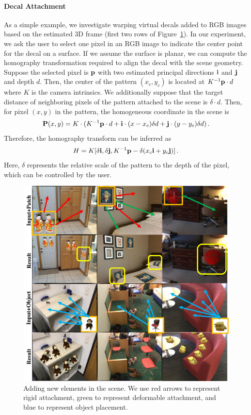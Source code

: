 \paragraph{Decal Attachment}  As a simple example, we investigate warping virtual decals added to RGB images based on the estimated 3D frame (first two rows of Figure~\ref{fig:framenet-attach}). In our experiment, we ask the user to select one pixel in an RGB image to indicate the center point for the decal on a surface.  If we assume the surface is planar, we can compute the homography transformation required to align the decal with the scene geometry. Suppose the selected pixel is $\mathbf{p}$ with two estimated principal directions $\mathbf{i}$ and $\mathbf{j}$ and depth $d$. Then, the center of the pattern $(x_c,y_c)$ is located at $K^{-1}\mathbf{p}\cdot d$ where $K$ is the camera intrinsics. We additionally suppose that the target distance of neighboring pixels of the pattern attached to the scene is $\delta\cdot d$. Then, for pixel $(x,y)$ in the pattern, the homogeneous coordinate in the scene is
\begin{equation}
\textbf{P}(x,y) = K\cdot(K^{-1}\mathbf{p}\cdot d + \textbf{i}\cdot (x-x_c)\delta d + \textbf{j}\cdot (y-y_c)\delta d)\,.
\end{equation}
Therefore, the homography transform can be inferred as
\begin{equation}
    H=K[\delta \mathbf{i}, \delta \mathbf{j}, K^{-1}\mathbf{p} - \delta(x_c\mathbf{i}+y_c\mathbf{j})]\,.
\end{equation}
Here, $\delta$ represents the relative scale of the pattern to the depth of the pixel, which can be controlled by the user.
\begin{figure}
    \centering
    \includegraphics[width=\linewidth]{FrameNet/graph/attach.pdf}
    \caption{Adding new elements in the scene. We  use red arrows to represent rigid attachment, green to represent deformable attachment, and blue to represent object placement.}
    \label{fig:framenet-attach}
    \vspace{-0.15in}
\end{figure}
